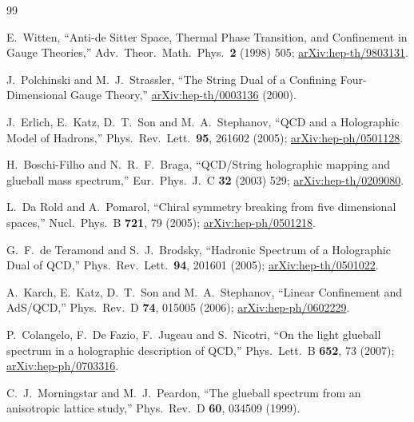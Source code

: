 \documentclass[reprint,prd,amsmath,amssymb,nofootinbib,superscriptaddress]{revtex4-2}
\begin{document}
\begin{thebibliography}{99}

  E.~Witten,
  ``Anti-de Sitter Space, Thermal Phase Transition, and Confinement in Gauge Theories,''
  Adv.~Theor.~Math.~Phys.\ \textbf{2} (1998) 505;
  \href{https://arxiv.org/abs/hep-th/9803131}{arXiv:hep-th/9803131}.

  J.~Polchinski and M.~J.~Strassler,
  ``The String Dual of a Confining Four-Dimensional Gauge Theory,''
  \href{https://arxiv.org/abs/hep-th/0003136}{arXiv:hep-th/0003136} (2000).

  J.~Erlich, E.~Katz, D.~T.~Son and M.~A.~Stephanov,
  ``QCD and a Holographic Model of Hadrons,''
  Phys.~Rev.~Lett.\ \textbf{95}, 261602 (2005);
  \href{https://arxiv.org/abs/hep-ph/0501128}{arXiv:hep-ph/0501128}.

  H.~Boschi-Filho and N.~R.~F.~Braga,
  ``QCD/String holographic mapping and glueball mass spectrum,''
  Eur.\ Phys.\ J.\ C \textbf{32} (2003) 529;
  \href{https://arxiv.org/abs/hep-th/0209080}{arXiv:hep-th/0209080}.

  L.~Da Rold and A.~Pomarol,
  ``Chiral symmetry breaking from five dimensional spaces,''
  Nucl.\ Phys.\ B \textbf{721}, 79 (2005);
  \href{https://arxiv.org/abs/hep-ph/0501218}{arXiv:hep-ph/0501218}.

  G.~F.~de Teramond and S.~J.~Brodsky,
  ``Hadronic Spectrum of a Holographic Dual of QCD,''
  Phys.\ Rev.\ Lett.\ \textbf{94}, 201601 (2005);
  \href{https://arxiv.org/abs/hep-th/0501022}{arXiv:hep-th/0501022}.

  A.~Karch, E.~Katz, D.~T.~Son and M.~A.~Stephanov,
  ``Linear Confinement and AdS/QCD,''
  Phys.\ Rev.\ D \textbf{74}, 015005 (2006);
  \href{https://arxiv.org/abs/hep-ph/0602229}{arXiv:hep-ph/0602229}.

  P.~Colangelo, F.~De Fazio, F.~Jugeau and S.~Nicotri,
  ``On the light glueball spectrum in a holographic description of QCD,''
  Phys.\ Lett.\ B \textbf{652}, 73 (2007);
  \href{https://arxiv.org/abs/hep-ph/0703316}{arXiv:hep-ph/0703316}.

  C.~J.~Morningstar and M.~J.~Peardon,
  ``The glueball spectrum from an anisotropic lattice study,''
  Phys.\ Rev.\ D \textbf{60}, 034509 (1999).


\end{thebibliography}
\end{document}
